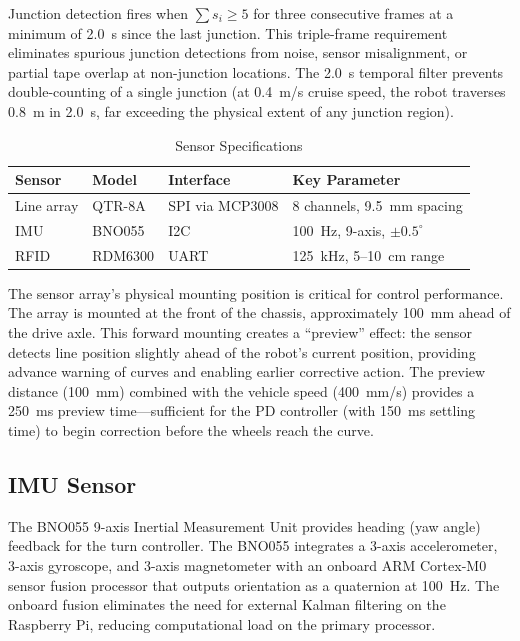\documentclass[12pt,a4paper,oneside]{report}
\begin{document}
Junction detection fires when $\sum s_i \geq 5$ for three consecutive frames at a minimum of 2.0~s since the last junction. This triple-frame requirement eliminates spurious junction detections from noise, sensor misalignment, or partial tape overlap at non-junction locations. The 2.0~s temporal filter prevents double-counting of a single junction (at 0.4~m/s cruise speed, the robot traverses 0.8~m in 2.0~s, far exceeding the physical extent of any junction region).

\begin{table}[H]
\centering
\caption{Sensor Specifications}
\label{tab:sensors}
\begin{tabular}{p{2.5cm} p{2.5cm} p{2cm} p{5cm}}
\toprule
\textbf{Sensor} & \textbf{Model} & \textbf{Interface} & \textbf{Key Parameter} \\
\midrule
Line array & QTR-8A & SPI via MCP3008 & 8 channels, 9.5~mm spacing \\
IMU & BNO055 & I2C & 100~Hz, 9-axis, $\pm 0.5^{\circ}$ \\
RFID & RDM6300 & UART & 125~kHz, 5--10~cm range \\
\bottomrule
\end{tabular}
\end{table}

The sensor array's physical mounting position is critical for control performance. The array is mounted at the front of the chassis, approximately 100~mm ahead of the drive axle. This forward mounting creates a ``preview'' effect: the sensor detects line position slightly ahead of the robot's current position, providing advance warning of curves and enabling earlier corrective action. The preview distance (100~mm) combined with the vehicle speed (400~mm/s) provides a 250~ms preview time---sufficient for the PD controller (with 150~ms settling time) to begin correction before the wheels reach the curve.

\subsection{IMU Sensor}

The BNO055 9-axis Inertial Measurement Unit provides heading (yaw angle) feedback for the turn controller. The BNO055 integrates a 3-axis accelerometer, 3-axis gyroscope, and 3-axis magnetometer with an onboard ARM Cortex-M0 sensor fusion processor that outputs orientation as a quaternion at 100~Hz. The onboard fusion eliminates the need for external Kalman filtering on the Raspberry Pi, reducing computational load on the primary processor.
\end{document}
